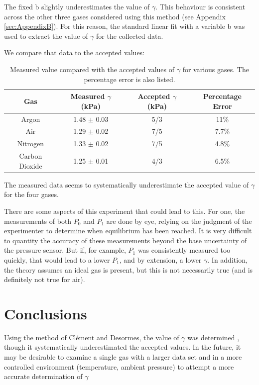 \documentclass[12pt]{article}
\begin{document}
The fixed b slightly underestimates the value of $\gamma$. This behaviour is consistent across the other three gases considered using this method (see Appendix \ref{sec:AppendixB}). For this reason, the standard linear fit with a variable b was used to extract the value of $\gamma$ for the collected data.

We compare that data to the accepted values:
\begin{center}
\begin{table}[H]
\begin{tabular}{c | c | c | c}
	Gas & Measured $\gamma$ (kPa) & Accepted $\gamma$ (kPa) & Percentage Error\\
	\hline
	Argon & 1.48 $\pm$ 0.03 & 5/3 & 11\%\\
	Air & 1.29 $\pm$ 0.02 & 7/5 & 7.7\%\\
	Nitrogen & 1.33 $\pm$ 0.02 & 7/5 & 4.8\%\\
	Carbon Dioxide & 1.25 $\pm$ 0.01 & 4/3 & 6.5\%\\
\end{tabular}
\caption{Measured value compared with the accepted values of $\gamma$ for various gases. The percentage error is also listed.}
\end{table}
\end{center}

The measured data seems to systematically underestimate the accepted value of $\gamma$ for the four gases. 

There are some aspects of this experiment that could lead to this. For one, the measurements of both $P_0$ and $P_1$ are done by eye, relying on the judgment of the experimenter to determine when equilibrium has been reached. It is very difficult to quantity the accuracy of these measurements beyond the base uncertainty of the pressure sensor. But if, for example, $P_1$ was consistently measured too quickly, that would lead to a lower $P_1$, and by extension, a lower $\gamma$. In addition, the theory assumes an ideal gas is present, but this is not necessarily true (and is definitely not true for air).
\section{Conclusions}
Using the method of Clément and Desormes, the value of $\gamma$ was determined , though it systematically underestimated the accepted values. In the future, it may be desirable to examine a single gas with a larger data set and in a more controlled environment (temperature, ambient pressure) to attempt a more accurate determination of $\gamma$
%
\end{document}
